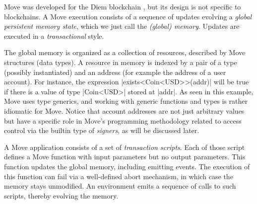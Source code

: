 

Move was developed for the Diem blockchain \cite{DIEM}, but its design is not
specific to blockchains.  A Move execution consists of a sequence of updates
evolving a \emph{global persistent memory state}, which we just call the
\emph{(global) memory}.  Updates are executed in a \emph{transactional} style.

The global memory is organized as a collection of resources, described by Move
structures (data types). A resource in memory is indexed by a pair of a type
(possibly instantiated) and an address (for example the address of a user
account). For instance, the expression |exists<Coin<USD>>(addr)| will be true if
there is a value of type |Coin<USD>| stored at |addr|. As seen in this example,
Move uses type generics, and working with generic functions and types is rather
idiomatic for Move.  Notice that account addresses are not just arbitrary values
but have a specific role in Move's programming methodology related to access
control via the builtin type of \emph{signers}, as will be discussed later.

A Move application consists of a set of \emph{transaction scripts}. Each of
those script defines a Move function with input parameters but no output
parameters.  This function updates the global memory, including emitting
events. The execution of this function can fail via a well-defined abort
mechanism, in which case the memory stays unmodified. An environment emits a
sequence of calls to such scripts, thereby evolving the memory.



